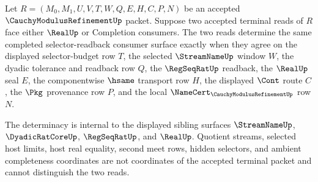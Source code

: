 \begin{theorem}
\label{thm:cauchy-modulus-refinement-root-terminal-selector-readback}
Let $R=(M_0,M_1,U,V,T,W,Q,E,H,C,P,N)$ be an accepted $\CauchyModulusRefinementUp$ packet. Suppose two accepted terminal reads of $R$ face either $\RealUp$ or Completion consumers. The two reads determine the same completed selector-readback consumer surface exactly when they agree on the displayed selector-budget row $T$, the selected $\StreamNameUp$ window $W$, the dyadic tolerance and readback row $Q$, the $\RegSeqRatUp$ readback, the $\RealUp$ seal $E$, the componentwise $\hsame$ transport row $H$, the displayed $\Cont$ route $C$, the $\Pkg$ provenance row $P$, and the local $\NameCert_{\CauchyModulusRefinementUp}$ row $N$.

The determinacy is internal to the displayed sibling surfaces $\StreamNameUp$, $\DyadicRatCoreUp$, $\RegSeqRatUp$, and $\RealUp$. Quotient streams, selected host limits, host real equality, second meet rows, hidden selectors, and ambient completeness coordinates are not coordinates of the accepted terminal packet and cannot distinguish the two reads.
\end{theorem}
